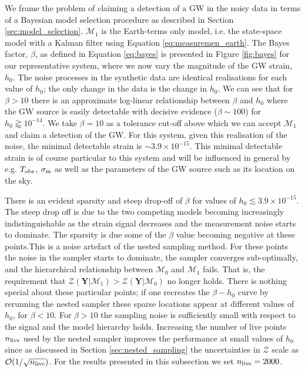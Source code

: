 \documentclass[fleqn,usenatbib,useAMS]{mnras}
\begin{document}
		
		
		
		
		
		
		
		
		
		We frame the problem of claiming a detection of a GW in the noisy data in terms of a Bayesian model selection procedure as described in Section \ref{sec:model_selection}. $\mathcal{M}_1$ is the Earth-terms only model, i.e. the state-space model with a Kalman filter using Equation \eqref{eq:measuremen_earth}. The Bayes factor, $\beta$, as defined in Equation \eqref{eq:bayes} is presented in Figure \ref{fig:bayes} for our representative system, where we now vary the magnitude of the GW strain, $h_0$. The noise processes in the synthetic data are identical realisations for each value of $h_0$; the only change in the data is the change in $h_0$. We can see that for $\beta >10$ there is an approximate log-linear relationship between $\beta$ and $h_0$ where the GW source is easily detectable with decisive evidence ($\beta \sim 100$) for $h_0 \gtrapprox 10^{-14}$. We take $\beta = 10$ as a tolerance cut-off above which we can accept $\mathcal{M}_1$ and claim a detection of the GW. For this system, given this realisation of the noise, the minimal detectable strain is $\sim 3.9 \times 10^{-15}$. This minimal detectable strain is of course particular to this system and will be influenced in general by e.g. $T_{\rm obs}$, $\sigma_{\rm m}$ as well as the parameters of the GW source such as its location on the sky. \newline 
		
		There is an evident sparsity and steep drop-off of $\beta$ for values of $h_0 \lesssim 3.9 \times10^{-15}$. The steep drop off is due to the two competing models becoming increasingly indistinguishable as the strain signal decreases and the measurement noise starts to dominate. The sparsity is due some of the $\beta$ value becoming negative at these points.This is a noise artefact of the nested sampling method. For these points the noise in the sampler starts to dominate, the sampler converges sub-optimally, and the hierarchical relationship between $\mathcal{M}_0$ and  $\mathcal{M}_1$ fails. That is, the requirement that $\mathcal{Z}(\boldsymbol{Y} | \mathcal{M}_1) > \mathcal{Z}(\boldsymbol{Y} | \mathcal{M}_0)$ no longer holds. There is nothing special about these particular points; if one recreates the $\beta - h_0$ curve by rerunning the nested sampler these sparse locations appear at different values of $h_0$, for $\beta < 10$. For $\beta > 10$ the sampling noise is sufficiently small with respect to the signal and the model hierarchy holds. Increasing the number of live points $n_{\rm live}$ used by the nested sampler improves the performance at small values of $h_0$ since as discussed in Section \ref{sec:nested_sampling} the uncertainties in $\mathcal{Z}$ scale as $\mathcal{O}(1/ \sqrt{n_{\rm live}})$. For the results presented in this subsection we set $n_{\rm live} =2000$. 
		
\end{document}
